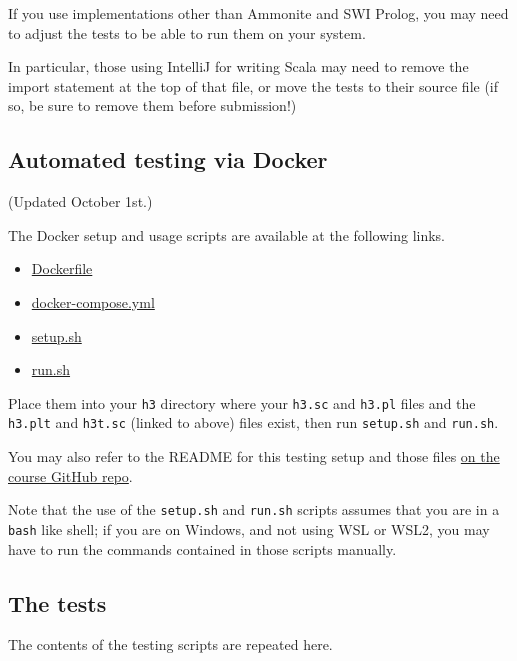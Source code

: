 \documentclass[11pt]{article}
\begin{document}
If you use implementations other than Ammonite and SWI Prolog,
you may need to adjust the tests to be able to run them
on your system.

In particular, those using IntelliJ for writing Scala
may need to remove the import statement at the top of that file,
or move the tests to their source file
(if so, be sure to remove them before submission!)

\subsection*{Automated testing via Docker}
\label{sec:orga6fd67e}
(Updated October 1st.)

The Docker setup and usage scripts are available at the following links.
\begin{itemize}
\item \href{./testing/h3/Dockerfile}{Dockerfile}
\item \href{./testing/h3/docker-compose.yml}{docker-compose.yml}
\item \href{./testing/h3/setup.sh}{setup.sh}
\item \href{./testing/h3/run.sh}{run.sh}
\end{itemize}
Place them into your \texttt{h3} directory where your \texttt{h3.sc} and \texttt{h3.pl} files
and the \texttt{h3.plt} and \texttt{h3t.sc} (linked to above) files exist,
then run \texttt{setup.sh} and \texttt{run.sh}.

You may also refer to the README
for this testing setup and those files
\href{https://github.com/armkeh/principles-of-programming-languages/tree/master/homework/testing/h3}{on the course GitHub repo}.

Note that the use of the \texttt{setup.sh} and \texttt{run.sh} scripts assumes
that you are in a \texttt{bash} like shell; if you are on Windows,
and not using WSL or WSL2, you may have
to run the commands contained in those scripts manually.

\subsection*{The tests}
\label{sec:org8d5a63d}
The contents of the testing scripts are repeated here.
\end{document}
